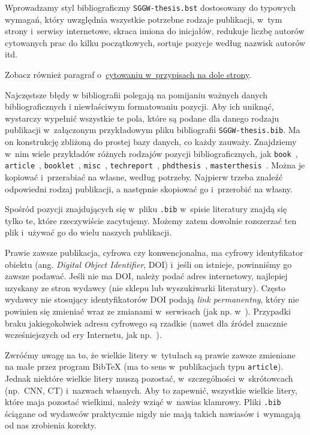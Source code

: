Wprowadzamy styl bibliograficzny {\tt SGGW-thesis.bst} dostosowany do typowych wymagań, który uwzględnia wszystkie potrzebne rodzaje publikacji, w~tym strony i~serwisy internetowe, skraca imiona do inicjałów, redukuje liczbę autorów cytowanych prac do kilku początkowych, sortuje pozycje według nazwisk autorów itd.

Zobacz również paragraf o~\hyperref[sec:dod:cytowanie-przypisy]{cytowaniu w~przypisach na dole strony}.

Najczęstsze błędy w bibliografii polegają na pomijaniu ważnych danych bibliograficznych i niewłaściwym formatowaniu pozycji. Aby ich uniknąć, wystarczy wypełnić wszystkie te pola, które są podane dla danego rodzaju publikacji w~załączonym przykładowym pliku bibliografii {\tt SGGW-thesis.bib}. Ma on konstrukcję zbliżoną do prostej bazy danych, co każdy zauważy. Znajdziemy w~nim wiele przykładów różnych rodzajów pozycji bibliograficznych, jak {\tt book}~, {\tt article}~, {\tt booklet}~, {\tt misc}~, {\tt techreport}~, {\tt phdthesis}~, {\tt masterthesis}~. Można je kopiować i~przerabiać na własne, według potrzeby. Najpierw trzeba znaleźć odpowiedni rodzaj publikacji, a następnie skopiować go i~przerobić na własny. 

Spośród pozycji znajdujących się w~pliku {\tt *.bib} w~spisie literatury znajdą się tylko te, które rzeczywiście zacytujemy. Możemy zatem dowolnie rozszerzać ten plik i~używać go do wielu naszych publikacji.

Prawie zawsze publikacja, cyfrowa czy konwencjonalna, ma cyfrowy identyfikator obiektu (ang. {\em Digital Object Identifier}, DOI) i~jeśli on istnieje, powinniśmy go zawsze podawać. Jeśli nie ma DOI, należy podać adres internetowy, najlepiej uzyskany ze stron wydawcy (nie sklepu lub wyszukiwarki literatury). Często wydawcy nie stosujący identyfikatorów DOI podają {\em link permanentny}, który nie powinien się zmieniać wraz ze zmianami w~serwisach (jak np. w~). Przypadki braku jakiegokolwiek adresu cyfrowego są rzadkie (nawet dla źródeł znacznie wcześniejszych od ery Internetu, jak np.~). 

Zwróćmy uwagę na to, że wielkie litery w~tytułach są prawie zawsze zmieniane na małe przez program Bib\TeX{} (ma to sens w~publikacjach typu {\tt article}). Jednak niektóre wielkie litery muszą pozostać, w~szczególności w~skrótowcach (np.\ CNN, CT) i~nazwach własnych. Aby to zapewnić, wszystkie wielkie litery, które maja pozostać wielkimi, należy wziąć w~nawias klamrowy. Pliki {\tt .bib} ściągane od wydawców praktycznie nigdy nie mają takich nawiasów i~wymagają od nas zrobienia korekty.

